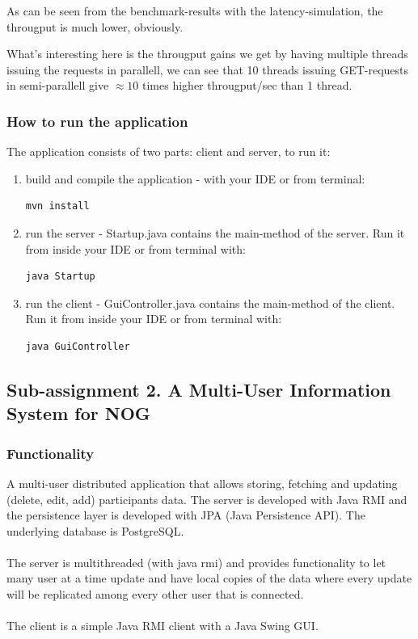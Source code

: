 \documentclass[a4paper, 11pt]{article}
\begin{document}
As can be seen from the benchmark-results with the latency-simulation, the througput is much lower, obviously.

What's interesting here is the througput gains we get by having multiple threads issuing the requests in parallell, we can see that 10 threads issuing GET-requests in semi-parallell give $\approx 10$ times higher througput/sec than 1 thread.
\subsubsection{How to run the application}
The application consists of two parts: client and server, to run it:
\begin{enumerate}
\item build and compile the application - with your IDE or from terminal:
\begin{verbatim}
mvn install
\end{verbatim}
\item run the server - Startup.java contains the main-method of the server. Run it from inside your IDE or from terminal with: 
\begin{verbatim}
java Startup
\end{verbatim}
\item run the client - GuiController.java contains the main-method of the client. Run it from inside your IDE or from terminal with: 
\begin{verbatim}
java GuiController
\end{verbatim}
\end{enumerate}
\subsection{Sub-assignment 2. A Multi-User Information System for NOG}
\subsubsection{Functionality}
A multi-user distributed application that allows storing, fetching and updating (delete, edit, add) participants data. The server is developed with Java RMI and the persistence layer is developed with JPA (Java Persistence API). The underlying database is PostgreSQL. \\ \\
The server is multithreaded (with java rmi) and provides functionality to let many user at a time update and have local copies of the data where every update will be replicated among every other user that is connected.
\\\\ The client is a simple Java RMI client with a Java Swing GUI.
\end{document}
